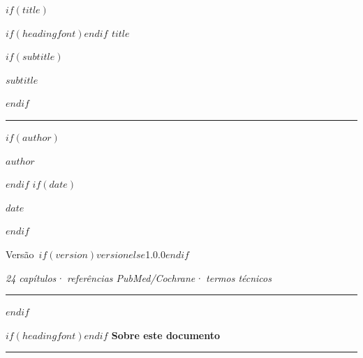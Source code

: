\documentclass[$if(fontsize)$$fontsize$,$endif$a4paper]{article}
\begin{document}
$if(title)$
\begin{titlepage}
  \centering
  \thispagestyle{empty}

  \vspace*{1.5cm}

  {\color{AccentFg}\fontsize{64}{68}\selectfont\faFire\par}
  \vspace{1.2cm}

  {\fontsize{36}{40}\selectfont\bfseries\color{HeadingFg}$if(headingfont)$\headingfontfamily$endif$ $title$ \par}
  \vspace{0.6cm}

  $if(subtitle)$
    {\fontsize{18}{22}\selectfont\color{AccentFg}\itshape $subtitle$ \par}
    \vspace{0.4cm}
  $endif$

  {\textcolor{AccentFg}{\rule{0.6\linewidth}{1.5pt}}\par}
  \vspace{2cm}

  $if(author)${\large\color{BodyFg}\faUser\quad $author$ \par\vspace{0.3cm}}$endif$
  $if(date)${\normalsize\color{BodyFg}\faCalendar\quad $date$ \par\vspace{0.3cm}}$endif$
  {\small\color{AccentFg}\faTags\quad Versão\ $if(version)$$version$$else$1.0.0$endif$\par}

  \vfill

  \begin{minipage}{0.75\linewidth}
    \centering\small\color{BodyFg}
    \textit{24 capítulos\enspace· referências PubMed/Cochrane\enspace· termos técnicos}
  \end{minipage}

  \vspace{1cm}
  {\textcolor{AccentFg}{\rule{\linewidth}{0.5pt}}\par}
\end{titlepage}
\newpage
$endif$

\thispagestyle{empty}
\vspace*{3cm}
\begin{center}
  {\Large\bfseries\color{HeadingFg}$if(headingfont)$\headingfontfamily$endif$ Sobre este documento\par}
  \vspace{0.5cm}
  {\textcolor{AccentFg}{\rule{0.3\linewidth}{0.8pt}}\par}
\end{center}
\vspace{1cm}
\end{document}
